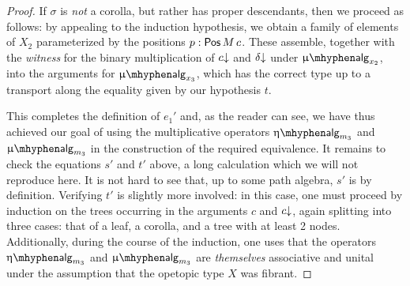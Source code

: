 \begin{proof}
  If $\sigma$ is \emph{not} a corolla, but rather has proper
  descendants, then we proceed as follows: by appealing to the
  induction hypothesis, we obtain a family of elements of $X_2$
  parameterized by the positions $p : \mathsf{Pos}\, M\, c$.  These assemble,
  together with the \emph{witness} for the binary multiplication of
  $c{\downarrow}$ and $\delta{\downarrow}$ under $\upmu\alg_{x_2}$, into the arguments
  for $\upmu\alg_{x_3}$, which has the correct type up to a transport
  along the equality given by our hypothesis $t$.

  This completes the definition of $e_1'$ and, as the reader can see,
  we have thus achieved our goal of using the multiplicative operators
  $\upeta\alg_{m_3}$ and $\upmu\alg_{m_3}$ in the construction of the
  required equivalence.  It remains to check the equations $s'$ and
  $t'$ above, a long calculation which we will not reproduce here.  It
  is not hard to see that, up to some path algebra, $s'$ is by
  definition.  Verifying $t'$ is slightly more involved: in this case,
  one must proceed by induction on the trees occurring in the
  arguments $c$ and $c{\downarrow}$, again splitting into three cases: that of
  a leaf, a corolla, and a tree with at least 2 nodes.  Additionally,
  during the course of the induction, one uses that the operators
  $\upeta\alg_{m_3}$ and $\upmu\alg_{m_3}$ are \emph{themselves}
  associative and unital under the assumption that the opetopic type
  $X$ was fibrant.
\end{proof}

